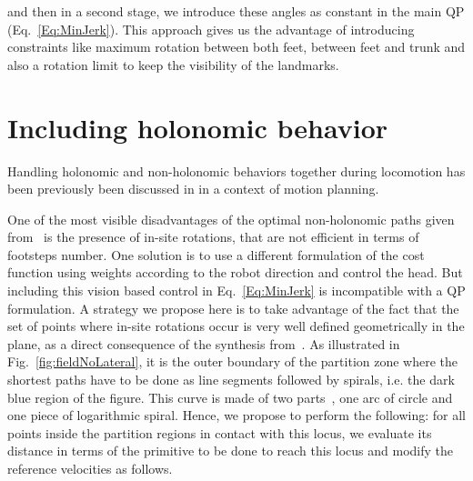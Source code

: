 and then in a second stage, we introduce these angles as constant in the main QP (Eq.~\ref{Eq:MinJerk}). This approach gives us the advantage of introducing constraints like maximum rotation between both feet, between feet and trunk and also a rotation limit to keep the visibility of the landmarks.





\section{Including holonomic behavior}
\label{sec:includingholonomic}

Handling holonomic and non-holonomic behaviors together during locomotion has been previously been discussed in \citep{MombaurHumanoids2008} in a context of motion planning.

One of the most visible disadvantages of the optimal non-holonomic paths given from~\citep{jib-IJHR2010} is the presence of in-site rotations, that are not efficient in terms of footsteps number.
One solution is to use a different formulation of the cost function using weights according to the robot direction and control the head.
But including this vision based control in Eq.~\ref{Eq:MinJerk} is incompatible with a QP formulation.
A strategy we propose here is to take advantage of the fact that the set of points where in-site rotations occur is very well defined geometrically in the plane, as a direct consequence of the synthesis from~\citep{Salaris:2010}. As illustrated in Fig.~\ref{fig:fieldNoLateral}, it is the outer boundary of the partition zone where the shortest paths have to be done as line segments followed by spirals, i.e. the dark blue region of the figure. This curve is made of two parts~\citep{Salaris:2010}, one arc of circle and one piece of logarithmic spiral. Hence, we propose to perform the following: for all points inside the partition regions in contact with this locus, we evaluate its distance in terms of the primitive to be done to reach this locus and modify the reference velocities as follows. 

